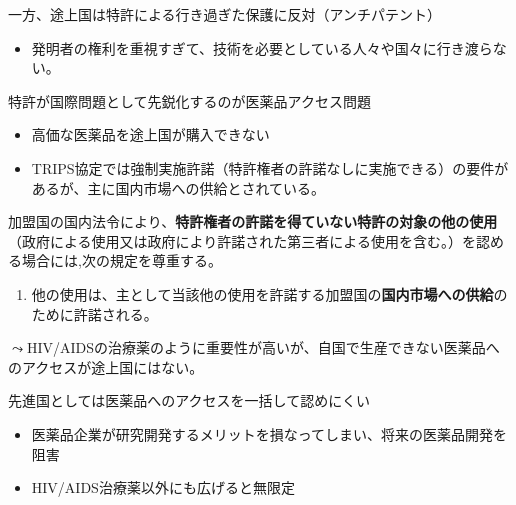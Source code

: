 \documentclass[
  xelatex,
  ja=standard]{bxjsarticle}
\providecommand{\tightlist}{%
  \setlength{\itemsep}{0pt}\setlength{\parskip}{0pt}}\usepackage{longtable,booktabs,array}
\begin{document}
一方、途上国は特許による行き過ぎた保護に反対（アンチパテント）

\begin{itemize}
\tightlist
\item
  発明者の権利を重視すぎて、技術を必要としている人々や国々に行き渡らない。
\end{itemize}

特許が国際問題として先鋭化するのが医薬品アクセス問題

\begin{itemize}
\tightlist
\item
  高価な医薬品を途上国が購入できない
\item
  TRIPS協定では強制実施許諾（特許権者の許諾なしに実施できる）の要件があるが、主に国内市場への供給とされている。
\end{itemize}

\begin{tcolorbox}[enhanced jigsaw, left=2mm, colframe=quarto-callout-note-color-frame, colback=white, coltitle=black, rightrule=.15mm, title=\textcolor{quarto-callout-note-color}{\faInfo}\hspace{0.5em}{\href{https://www.jpo.go.jp/system/laws/gaikoku/trips/index.html}{TRIPS協定}　第31条}, arc=.35mm, toprule=.15mm, bottomrule=.15mm, leftrule=.75mm, bottomtitle=1mm, toptitle=1mm, titlerule=0mm, breakable, opacitybacktitle=0.6, colbacktitle=quarto-callout-note-color!10!white, opacityback=0]

加盟国の国内法令により、\textbf{特許権者の許諾を得ていない特許の対象の他の使用}（政府による使用又は政府により許諾された第三者による使用を含む。）を認める場合には,次の規定を尊重する。

\begin{enumerate}
\def\labelenumi{\alph{enumi}.}
\setcounter{enumi}{5}
\tightlist
\item
  他の使用は、主として当該他の使用を許諾する加盟国の\textbf{国内市場への供給}のために許諾される。
\end{enumerate}

\end{tcolorbox}

\(\leadsto\)HIV/AIDSの治療薬のように重要性が高いが、自国で生産できない医薬品へのアクセスが途上国にはない。

先進国としては医薬品へのアクセスを一括して認めにくい

\begin{itemize}
\tightlist
\item
  医薬品企業が研究開発するメリットを損なってしまい、将来の医薬品開発を阻害
\item
  HIV/AIDS治療薬以外にも広げると無限定
\end{itemize}
\end{document}
